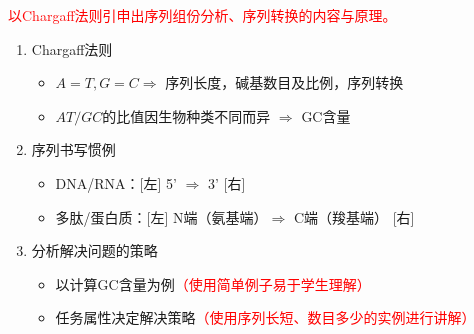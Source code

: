 \documentclass{TIJMUjiaoanLL}
\begin{document}
\textcolor{red}{以Chargaff法则引申出序列组份分析、序列转换的内容与原理。}
\begin{enumerate}
  \item Chargaff法则
    \begin{itemize}
      \item $A=T, G=C \Rightarrow$ 序列长度，碱基数目及比例，序列转换
      \item $AT/GC$的比值因生物种类不同而异 $\Rightarrow$ GC含量
    \end{itemize}
  \vspace*{-10pt}
  \vspace*{-15pt}
  \item 序列书写惯例
    \begin{itemize}
      \item DNA/RNA：[左] 5' $\Longrightarrow$ 3' [右]
      \item 多肽/蛋白质：[左] N端（氨基端）$\Longrightarrow$ C端（羧基端） [右]
    \end{itemize}
  \item 分析解决问题的策略
    \begin{itemize}
      \item 以计算GC含量为例\textcolor{red}{（使用简单例子易于学生理解）}
      \item 任务属性决定解决策略\textcolor{red}{（使用序列长短、数目多少的实例进行讲解）}
    \end{itemize}
\end{enumerate}
\end{document}
